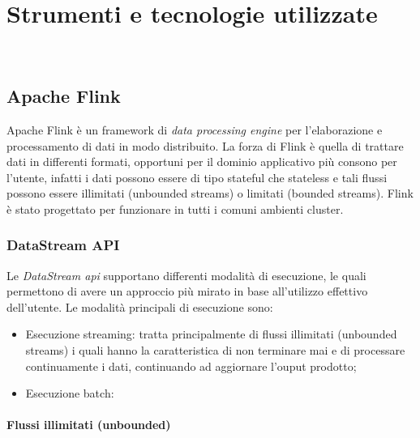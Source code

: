 
\chapter{Strumenti e tecnologie utilizzate}
\label{cap:strumenti-tecnologie}


\\

\section{Apache Flink}
Apache Flink è un \gls{framework} di \textit{data processing engine} per l'elaborazione e processamento di dati in modo distribuito.
La forza di Flink è quella di trattare dati in differenti formati, opportuni per il dominio applicativo più consono per l'utente, infatti i dati possono essere di tipo \gls{stateful} che \gls{stateless} e tali flussi possono essere illimitati (\gls{unbounded streams}) o limitati (\gls{bounded streams}). Flink è stato progettato per funzionare in tutti i comuni ambienti \gls{cluster}.

\subsection{DataStream API}
Le \textit{DataStream \gls{api}} supportano differenti modalità di esecuzione, le quali permettono di avere un approccio più mirato in base all'utilizzo effettivo dell'utente.
Le modalità principali di esecuzione sono:
\begin{itemize}
	\item{Esecuzione streaming:} tratta principalmente di flussi illimitati (\gls{unbounded streams}) i quali hanno la caratteristica di non terminare mai e di processare continuamente i dati, continuando ad aggiornare l'ouput prodotto;
	\item{Esecuzione batch:}
\end{itemize}
\subsubsection{Flussi illimitati (unbounded)}
